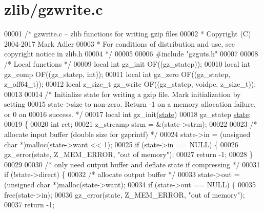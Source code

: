 \hypertarget{zlib_2gzwrite_8c_source}{}\section{zlib/gzwrite.c}
\label{zlib_2gzwrite_8c_source}

\begin{DoxyCode}
00001 \textcolor{comment}{/* gzwrite.c -- zlib functions for writing gzip files}
00002 \textcolor{comment}{ * Copyright (C) 2004-2017 Mark Adler}
00003 \textcolor{comment}{ * For conditions of distribution and use, see copyright notice in zlib.h}
00004 \textcolor{comment}{ */}
00005 
00006 \textcolor{preprocessor}{#include "gzguts.h"}
00007 
00008 \textcolor{comment}{/* Local functions */}
00009 local \textcolor{keywordtype}{int} gz\_init OF((gz\_statep));
00010 local \textcolor{keywordtype}{int} gz\_comp OF((gz\_statep, \textcolor{keywordtype}{int}));
00011 local \textcolor{keywordtype}{int} gz\_zero OF((gz\_statep, z\_off64\_t));
00012 local z\_size\_t gz\_write OF((gz\_statep, voidpc, z\_size\_t));
00013 
00014 \textcolor{comment}{/* Initialize state for writing a gzip file.  Mark initialization by setting}
00015 \textcolor{comment}{   state->size to non-zero.  Return -1 on a memory allocation failure, or 0 on}
00016 \textcolor{comment}{   success. */}
00017 local \textcolor{keywordtype}{int} gz\_init(\hyperlink{structstate}{state})
00018     gz\_statep \hyperlink{structstate}{state};
00019 \{
00020     \textcolor{keywordtype}{int} ret;
00021     z\_streamp strm = &(state->strm);
00022 
00023     \textcolor{comment}{/* allocate input buffer (double size for gzprintf) */}
00024     state->in = (\textcolor{keywordtype}{unsigned} \textcolor{keywordtype}{char} *)malloc(state->want << 1);
00025     \textcolor{keywordflow}{if} (state->in == NULL) \{
00026         gz\_error(state, Z\_MEM\_ERROR, \textcolor{stringliteral}{"out of memory"});
00027         \textcolor{keywordflow}{return} -1;
00028     \}
00029 
00030     \textcolor{comment}{/* only need output buffer and deflate state if compressing */}
00031     \textcolor{keywordflow}{if} (!state->direct) \{
00032         \textcolor{comment}{/* allocate output buffer */}
00033         state->out = (\textcolor{keywordtype}{unsigned} \textcolor{keywordtype}{char} *)malloc(state->want);
00034         \textcolor{keywordflow}{if} (state->out == NULL) \{
00035             free(state->in);
00036             gz\_error(state, Z\_MEM\_ERROR, \textcolor{stringliteral}{"out of memory"});
00037             \textcolor{keywordflow}{return} -1;

\end{DoxyCode}

